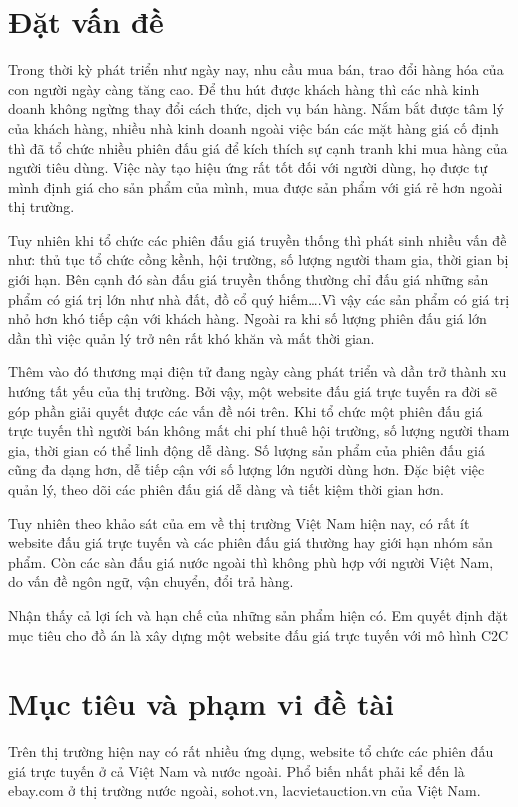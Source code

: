 \documentclass[../DoAn.tex]{subfiles}
\begin{document}
\section{Đặt vấn đề}
\label{section:1.1}
Trong thời kỳ phát triển như ngày nay, nhu cầu mua bán, trao đổi hàng hóa của con người ngày càng tăng cao. Để thu hút được khách hàng thì các nhà kinh doanh không ngừng thay đổi cách thức, dịch vụ bán hàng. Nắm bắt được tâm lý của khách hàng, nhiều nhà kinh doanh ngoài việc bán các mặt hàng giá cố định thì đã tổ chức nhiều phiên đấu giá để kích thích sự cạnh tranh khi mua hàng của người tiêu dùng. Việc này tạo hiệu ứng rất tốt đối với người dùng, họ được tự mình định giá cho sản phẩm của mình, mua được sản phẩm với giá rẻ hơn ngoài thị trường. 

Tuy nhiên khi tổ chức các phiên đấu giá truyền thống thì phát sinh nhiều vấn đề như: thủ tục tổ chức cồng kềnh, hội trường, số lượng người tham gia, thời gian bị giới hạn. Bên cạnh đó sàn đấu giá truyền thống thường chỉ đấu giá những sản phẩm có giá trị lớn như nhà đất, đồ cổ quý hiếm….Vì vậy các sản phẩm có giá trị nhỏ hơn khó tiếp cận với khách hàng. Ngoài ra khi số lượng phiên đấu giá lớn dần thì việc quản lý trở nên rất khó khăn và mất thời gian.

Thêm vào đó thương mại điện tử đang ngày càng phát triển và dần trở thành xu hướng tất yếu của thị trường. Bởi vậy, một website đấu giá trực tuyến ra đời sẽ góp phần giải quyết được các vấn đề nói trên. Khi tổ chức một phiên đấu giá trực tuyến thì người bán không mất chi phí thuê hội trường, số lượng người tham gia, thời gian có thể linh động dễ dàng. Số lượng sản phẩm của phiên đấu giá cũng đa dạng hơn, dễ tiếp cận với số lượng lớn người dùng hơn. Đặc biệt việc quản lý, theo dõi các phiên đấu giá dễ dàng và tiết kiệm thời gian hơn.

Tuy nhiên theo khảo sát của em về thị trường Việt Nam hiện nay, có rất ít website đấu giá trực tuyến và các phiên đấu giá thường hay giới hạn nhóm sản phẩm. Còn các sàn đấu giá nước ngoài thì không phù hợp với người Việt Nam, do vấn đề ngôn ngữ, vận chuyển, đổi trả hàng.

Nhận thấy cả lợi ích và hạn chế của những sản phẩm hiện có. Em quyết định đặt mục tiêu cho đồ án là xây dựng một website đấu giá trực tuyến với mô hình C2C
\section{Mục tiêu và phạm vi đề tài}
\label{section:1.2}
Trên thị trường hiện nay có rất nhiều ứng dụng, website tổ chức các phiên đấu giá trực tuyến ở cả Việt Nam và nước ngoài. Phổ biến nhất phải kể đến là ebay.com  ở thị trường nước ngoài, sohot.vn, lacvietauction.vn của Việt Nam.
\end{document}
